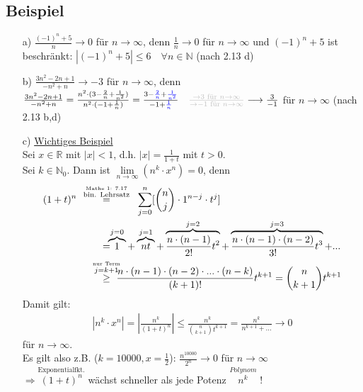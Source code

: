 \documentclass[12pt, titlepage]{article}
\newcommand{\R}{\mathds{R}}
\newcommand{\N}{\mathds{N}}
\newcommand{\infn}{n\rightarrow\infty}
\newcommand{\bmark}[1]{\textcolor{blue}{#1}}
\newcommand{\gmark}[1]{\textcolor{lightgray}{#1}}
\renewcommand{\>}{\rightarrow}
\renewcommand{\*}{\cdot}
\begin{document}
	\subsection{Beispiel}
	\begin{itemize}
		\item[a)] $\frac{(-1)^n+5}{n}\>0$ für $\infn$, denn $\frac{1}{n}\>0$ für $\infn$ und $(-1)^n+5$ ist beschränkt: $|(-1)^n+5|\leq6\quad\forall n\in\N$ (nach 2.13 d)
		\item[b)] $\frac{3n^2-2n+1}{-n^2+n}\>-3$ für $\infn$, denn\\ $\frac{3n^2-2n+1}{-n^2+n}=\frac{n^2\*(3-\frac{2}{n}+\frac{1}{n^2})}{n^2\*(-1+\frac{1}{n})}=\frac{3-\bmark{\frac{2}{n}}+\bmark{\frac{1}{n^2}}}{-1+\bmark{\frac{1}{n}}}\quad\gmark{\frac{\>3\textrm{ für }\infn}{\>-1\textrm{ für }\infn}}\longrightarrow\frac{3}{-1}$ für $\infn$ (nach 2.13 b,d)\begin{tiny}
			[\bmark{Nullfolgen}]
		\end{tiny}
		\item[c)] \underline{Wichtiges Beispiel}\\
		Sei $x\in\R$ mit $|x|<1$, d.h. $|x|=\frac{1}{1+t}$ mit $t>0$.\\
		Sei $k\in\N_0$. Dann ist $\lim\limits_{\infn}(n^k\*x^n)=0$, denn
		\begin{align*}
			(1+t)^n\quad&\qquad\mathclap{\overset{\overset{\textrm{Mathe 1: 7.17}}{\textrm{bin. Lehrsatz}}}{=}}\qquad\quad\sum_{j=0}^{n}[\binom{n}{j}\*1^{n-j}\*t^j]\\
			&\qquad\mathclap{=}\overbrace{1}^{j=0}+\overbrace{nt}^{j=1}+\overbrace{\frac{n\*(n-1)}{2!}t^2}^{j=2}+\overbrace{\frac{n\*(n-1)\*(n-2)}{3!}t^3}^{j=3}+...\\
			&\qquad\mathclap{\overset{\overset{\textrm{nur Term}}{j=k+1}}{\geq}}\quad\frac{n\*(n-1)\*(n-2)\*...\*(n-k)}{(k+1)!}t^{k+1}=\binom{n}{k+1}t^{k+1}
		\end{align*}
		Damit gilt:
		\begin{align*}
			|n^k\*x^n|=|\frac{n^k}{(1+t)^n}|\leq\frac{n^k}{\binom{n}{k+1}t^{k+1}}=\frac{n^k}{n^{k+1}+...}\> 0
		\end{align*}
		für $\infn$.\\
		Es gilt also z.B. ($k=10000, x=\frac{1}{2}$): $\frac{n^{10000}}{2^{n}} \> 0$ für $\infn$\\
		$\Rightarrow \overset{\textrm{Exponentialfkt.}}{(1+t)^n}$ wächst schneller als jede Potenz $\overset{Polynom}{n^k}$ !
	\end{itemize}
\end{document}
